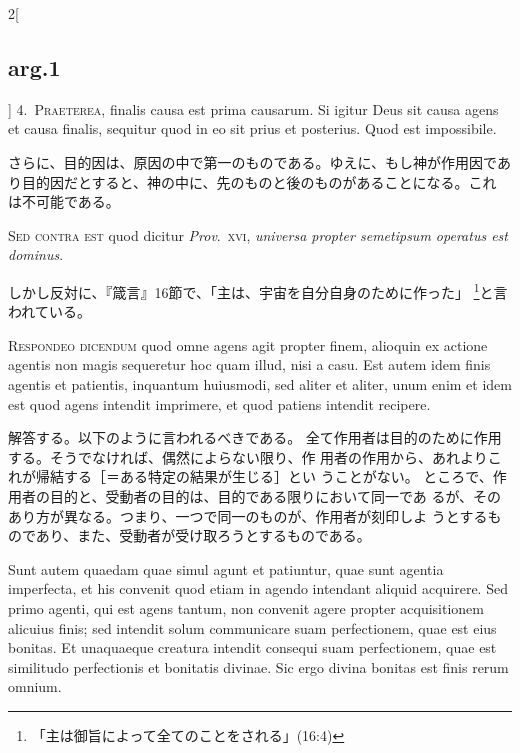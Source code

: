 \documentclass[paper=a4paper,fontsize=10pt,jafontsize=9pt,titlepage]{jlreq}
\begin{document}
\begin{paracol}{2}[\subsection{arg.1}]
4.~{\scshape Praeterea}, finalis causa est prima
causarum. Si igitur Deus sit causa agens et causa finalis, sequitur quod
in eo sit prius et posterius. Quod est impossibile.

\switchcolumn

さらに、目的因は、原因の中で第一のものである。ゆえに、もし神が作用因であ
 り目的因だとすると、神の中に、先のものと後のものがあることになる。これ
 は不可能である。

\switchcolumn*[\subsection{s.c.}]

{\scshape Sed contra est} quod dicitur {\itshape Prov}.~{\scshape xvi},
{\itshape universa propter semetipsum operatus est dominus}.

\switchcolumn

しかし反対に、『箴言』16節で、「主は、宇宙を自分自身のために作った」
 \footnote{「主は御旨によって全てのことをされる」(16:4)}と言
 われている。


{\scshape Respondeo dicendum} quod omne agens agit
propter finem, alioquin ex actione agentis non magis sequeretur hoc quam
illud, nisi a casu. Est autem idem finis agentis et patientis, inquantum
huiusmodi, sed aliter et aliter, unum enim et idem est quod agens
intendit imprimere, et quod patiens intendit recipere.

\switchcolumn

解答する。以下のように言われるべきである。
全て作用者は目的のために作用する。そうでなければ、偶然によらない限り、作
 用者の作用から、あれよりこれが帰結する［＝ある特定の結果が生じる］とい
 うことがない。
ところで、作用者の目的と、受動者の目的は、目的である限りにおいて同一であ
 るが、そのあり方が異なる。つまり、一つで同一のものが、作用者が刻印しよ
 うとするものであり、また、受動者が受け取ろうとするものである。

\switchcolumn*

Sunt autem
quaedam quae simul agunt et patiuntur, quae sunt agentia imperfecta, et
his convenit quod etiam in agendo intendant aliquid acquirere. Sed primo
agenti, qui est agens tantum, non convenit agere propter acquisitionem
alicuius finis; sed intendit solum communicare suam perfectionem, quae
est eius bonitas. Et unaquaeque creatura intendit consequi suam
perfectionem, quae est similitudo perfectionis et bonitatis divinae. Sic
ergo divina bonitas est finis rerum omnium.


\end{paracol}
\end{document}
